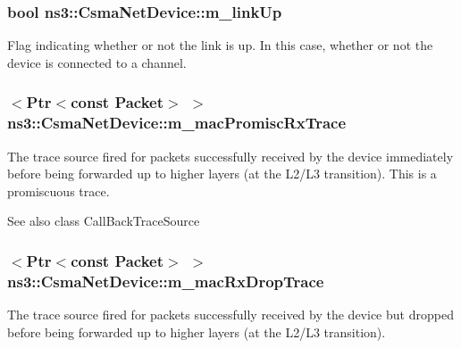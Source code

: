 \subsubsection[{\texorpdfstring{m\+\_\+link\+Up}{m_linkUp}}]{\setlength{\rightskip}{0pt plus 5cm}bool ns3\+::\+Csma\+Net\+Device\+::m\+\_\+link\+Up\hspace{0.3cm}{\ttfamily [private]}}\hypertarget{classns3_1_1CsmaNetDevice_afc0b0c430b9ee8e8ddde196c340b5764}{}\label{classns3_1_1CsmaNetDevice_afc0b0c430b9ee8e8ddde196c340b5764}
Flag indicating whether or not the link is up. In this case, whether or not the device is connected to a channel. 
\subsubsection[{\texorpdfstring{m\+\_\+mac\+Promisc\+Rx\+Trace}{m_macPromiscRxTrace}}]{$<${\bf Ptr}$<$const {\bf Packet}$>$ $>$ ns3\+::\+Csma\+Net\+Device\+::m\+\_\+mac\+Promisc\+Rx\+Trace\hspace{0.3cm}{\ttfamily [private]}}\hypertarget{classns3_1_1CsmaNetDevice_a4b22f431d8511abaf9ef4e92cc41ce24}{}\label{classns3_1_1CsmaNetDevice_a4b22f431d8511abaf9ef4e92cc41ce24}
The trace source fired for packets successfully received by the device immediately before being forwarded up to higher layers (at the L2/\+L3 transition). This is a promiscuous trace.

\begin{DoxySeeAlso}{See also}
class Call\+Back\+Trace\+Source 
\end{DoxySeeAlso}
\subsubsection[{\texorpdfstring{m\+\_\+mac\+Rx\+Drop\+Trace}{m_macRxDropTrace}}]{$<${\bf Ptr}$<$const {\bf Packet}$>$ $>$ ns3\+::\+Csma\+Net\+Device\+::m\+\_\+mac\+Rx\+Drop\+Trace\hspace{0.3cm}{\ttfamily [private]}}\hypertarget{classns3_1_1CsmaNetDevice_a0ba6e9b6d9403e55044c695ece47e311}{}\label{classns3_1_1CsmaNetDevice_a0ba6e9b6d9403e55044c695ece47e311}
The trace source fired for packets successfully received by the device but dropped before being forwarded up to higher layers (at the L2/\+L3 transition).

